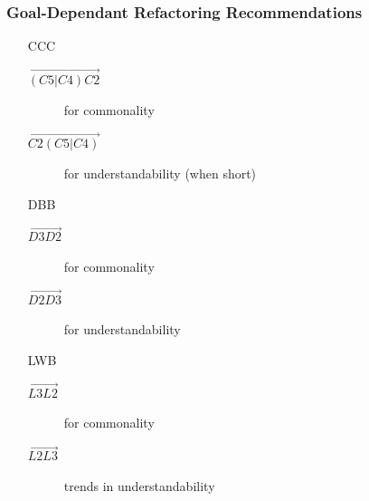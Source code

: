 
\begin{frame}
\frametitle{Goal-Dependant Refactoring Recommendations}
\begin{itemize}
\item[CCC]
\begin{description}
\item[$\overrightarrow{(C5|C4) C2}$] for commonality
\item[$\overrightarrow{C2 (C5|C4)}$] for understandability (when short)
\end{description}
\item[DBB]
\begin{description}
\item[$\overrightarrow{D3 D2}$] for commonality
\item[$\overrightarrow{D2 D3}$] for understandability
\end{description}
\item[LWB]
\begin{description}
\item[$\overrightarrow{L3 L2}$] for commonality
\item[$\overrightarrow{L2 L3}$] trends in understandability
\end{description}
\end{itemize}
\end{frame}


\note[itemize]{
\item[LIT]
}

